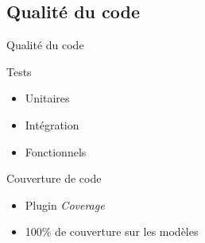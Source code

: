 \FlorentSpeak
\subsection{Qualit\'e du code}
\begin{frame}{Qualité du code}
	\begin{block}{Tests}
		\begin{itemize}
			\item Unitaires
			\item Intégration
			\item Fonctionnels %
		\end{itemize}
	\end{block}	
	\vfill
	\pause
	\begin{block}{Couverture de code}
		\begin{itemize}
			\item Plugin \textit{Coverage}
			\item 100\% de couverture sur les modèles  \cmark
		\end{itemize}
	\end{block}	
\end{frame}